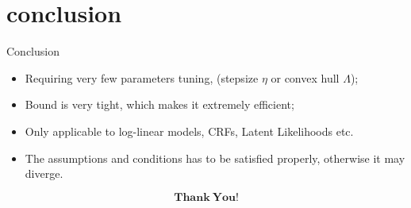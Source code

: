 \documentclass{beamer}
\begin{document}
\section{conclusion}

 \begin{frame}
  \begin{block}{Conclusion}
        \begin{itemize}
          \item Requiring very few parameters tuning, (stepsize $\eta$ or convex hull $\Lambda$);
       
          \item Bound is very tight, which makes it extremely efficient;
         
          \item Only applicable to log-linear models, CRFs, Latent Likelihoods etc.
          
          \item The assumptions and conditions has to be satisfied properly, otherwise it may diverge.
      
        \end{itemize}
      \end{block}
      \end{frame}

\begin{frame}
  \begin{block}{}
    \begin{equation}
      \mathbf{Thank} \ \mathbf{You} \mathbf{!} \nonumber
    \end{equation}
  \end{block}
\end{frame}
\end{document}
